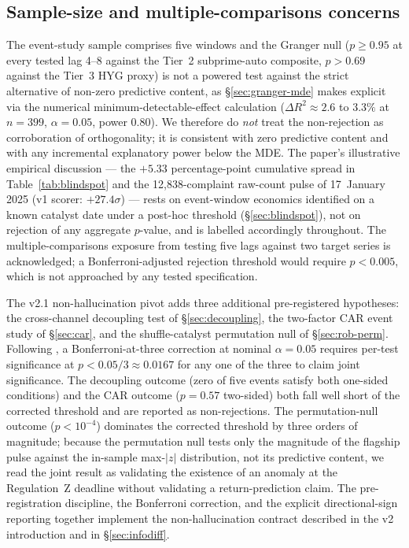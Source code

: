 \documentclass[11pt,letterpaper]{article}
\begin{document}
\subsection{Sample-size and multiple-comparisons concerns}
\label{sec:rob-sample}
The event-study sample comprises five windows and the Granger
null ($p \geq 0.95$ at every tested lag 4--8 against the Tier~2
subprime-auto composite, $p > 0.69$ against the Tier~3 HYG
proxy) is not a powered test against the strict alternative of
non-zero predictive content, as \S\ref{sec:granger-mde} makes
explicit via the numerical minimum-detectable-effect calculation
($\Delta R^2 \approx 2.6$ to $3.3\%$ at $n=399$, $\alpha=0.05$,
power $0.80$). We therefore do \emph{not} treat the non-rejection
as corroboration of orthogonality; it is consistent with zero
predictive content and with any incremental explanatory power
below the MDE. The paper's illustrative empirical discussion ---
the $+5.33$ percentage-point cumulative spread in
Table~\ref{tab:blindspot} and the 12{,}838-complaint raw-count
pulse of 17~January 2025 (v1 scorer: $+27.4\sigma$) --- rests on
event-window economics identified on a known catalyst date under
a post-hoc threshold (\S\ref{sec:blindspot}), not on rejection of
any aggregate $p$-value, and is labelled accordingly throughout.
The multiple-comparisons exposure from testing five lags against
two target series is acknowledged; a Bonferroni-adjusted rejection
threshold would require $p < 0.005$, which is not approached by
any tested specification.

The v2.1 non-hallucination pivot adds three additional pre-registered
hypotheses: the cross-channel decoupling test of
\S\ref{sec:decoupling}, the two-factor CAR event study of
\S\ref{sec:car}, and the shuffle-catalyst permutation null of
\S\ref{sec:rob-perm}. Following \citet{harvey2016backtesting}, a
Bonferroni-at-three correction at nominal $\alpha = 0.05$ requires
per-test significance at $p < 0.05/3 \approx 0.0167$ for any one
of the three to claim joint significance. The decoupling outcome
(zero of five events satisfy both one-sided conditions) and the CAR
outcome ($p = 0.57$ two-sided) both fall well short of the
corrected threshold and are reported as non-rejections. The
permutation-null outcome ($p < 10^{-4}$) dominates the corrected
threshold by three orders of magnitude; because the permutation null
tests only the magnitude of the flagship pulse against the in-sample
max-$|z|$ distribution, not its predictive content, we read the
joint result as validating the existence of an anomaly at the
Regulation~Z deadline without validating a return-prediction claim.
The pre-registration discipline, the Bonferroni correction, and the
explicit directional-sign reporting together implement the
non-hallucination contract described in the v2 introduction and in
\S\ref{sec:infodiff}.
\end{document}
